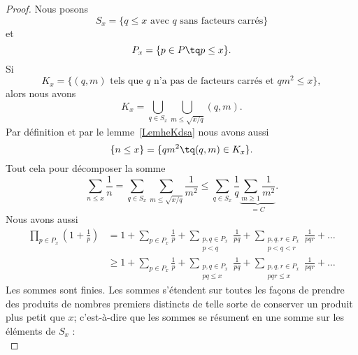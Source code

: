 \begin{proof}
    Nous posons
    \begin{equation}
        S_x=\{  q\leq x\text{ avec } q\text{ sans facteurs carrés} \}
    \end{equation}
    et
    \begin{equation}
        P_x=\{ p\in P\tq p\leq x \}.
    \end{equation}
    Si
    \begin{equation}
        K_x=\{  (q,m)\text{ tels que } q\text{ n'a pas de facteurs carrés et } qm^2\leq x \},
    \end{equation}
    alors nous avons
    \begin{equation}
        K_x=\bigcup_{q\in S_x}\bigcup_{m\leq \sqrt{x/q}}(q,m).
    \end{equation}
    Par définition et par le lemme~\ref{LemheKdsa} nous avons aussi
    \begin{equation}
        \{ n\leq x \}=\{ qm^2\tq (q,m)\in K_x \}.
    \end{equation}
    Tout cela pour décomposer la somme
    \begin{equation}        \label{EqpoJpuC}
        \sum_{n\leq x}\frac{1}{ n }=\sum_{q\in S_x}\sum_{m\leq\sqrt{x/q}}\frac{1}{ m^2 }\leq \sum_{q\in S_x}\frac{1}{ q }\underbrace{\sum_{m\geq 1}\frac{1}{ m^2 }}_{=C}.
    \end{equation}
    Nous avons aussi
    \begin{subequations}
        \begin{align}
            \prod_{p\in P_x}\left( 1+\frac{1}{ p } \right)&=1+\sum_{p\in P_x}\frac{1}{ p }+\sum_{\substack{p,q\in P_x\\p<q}}\frac{1}{ pq }+\sum_{\substack{p,q,r\in P_x\\p<q<r}}\frac{1}{ pqr }+\ldots\\
            &\geq 1+\sum_{p\in P_x}\frac{1}{ p }+\sum_{\substack{p,q\in P_x\\pq\leq x}}\frac{1}{ pq }+\sum_{\substack{p,q,r\in P_x\\pqr\leq x}}\frac{1}{ pqr }+\ldots
        \end{align}
    \end{subequations}
    Les sommes sont finies. Les sommes s'étendent sur toutes les façons de prendre des produits de nombres premiers distincts de telle sorte de conserver un produit plus petit que \( x\); c'est-à-dire que les sommes se résument en une somme sur les éléments de \( S_x\) :
    \begin{equation}        \label{EqooilOz}

\end{equation}
\end{proof}
